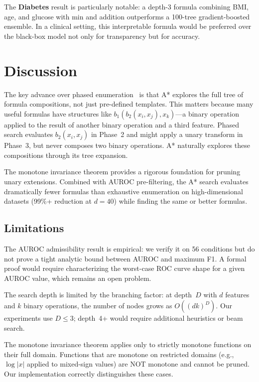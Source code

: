 \documentclass[journal]{IEEEtran}
\begin{document}
The \textbf{Diabetes} result is particularly notable: a depth-3
formula combining BMI, age, and glucose with min and addition
outperforms a 100-tree gradient-boosted ensemble. In a clinical
setting, this interpretable formula would be preferred over the
black-box model not only for transparency but for accuracy.

\section{Discussion}

The key advance over phased enumeration~\cite{bond2026phased} is
that A* explores the full tree of formula compositions, not just
pre-defined templates. This matters because many useful formulas
have structures like $b_1(b_2(x_i, x_j), x_k)$---a binary operation
applied to the result of another binary operation and a third feature.
Phased search evaluates $b_2(x_i, x_j)$ in Phase~2 and might apply
a unary transform in Phase~3, but never composes two binary operations.
A* naturally explores these compositions through its tree expansion.

The monotone invariance theorem provides a rigorous foundation for
pruning unary extensions. Combined with AUROC pre-filtering, the
A* search evaluates dramatically fewer formulas than exhaustive
enumeration on high-dimensional datasets (99\%+ reduction at $d=40$)
while finding the same or better formulas.

\subsection{Limitations}

The AUROC admissibility result is empirical: we verify it on 56
conditions but do not prove a tight analytic bound between AUROC
and maximum F1. A formal proof would require characterizing the
worst-case ROC curve shape for a given AUROC value, which remains
an open problem.

The search depth is limited by the branching factor: at depth~$D$
with $d$ features and $k$ binary operations, the number of nodes
grows as $O((dk)^D)$. Our experiments use $D \leq 3$; depth~4+
would require additional heuristics or beam search.

The monotone invariance theorem applies only to strictly monotone
functions on their full domain. Functions that are monotone on
restricted domains (e.g., $\log|x|$ applied to mixed-sign values)
are NOT monotone and cannot be pruned. Our implementation correctly
distinguishes these cases.
\end{document}
